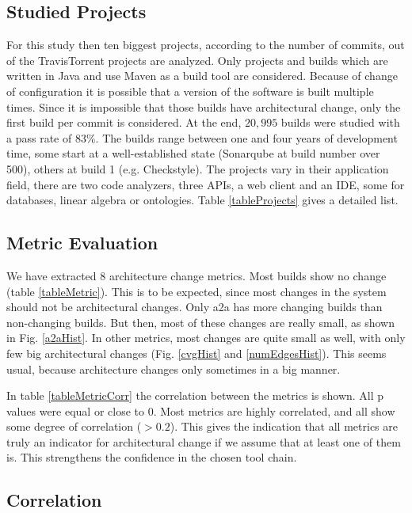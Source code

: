 \documentclass[conference]{IEEEtran}
\begin{document}
\subsection{Studied Projects}

For this study then ten biggest projects, according to the number of commits, out of the TravisTorrent projects are analyzed. Only projects and builds which are written in Java and use Maven as a build tool are considered. Because of change of configuration it is possible that a version of the software is built multiple times. Since it is impossible that those builds have architectural change, only the first build per commit is considered. At the end, $20,995$ builds were studied with a pass rate of $83\%$. The builds range between one and four years of development time, some start at a well-established state (Sonarqube at build number over 500), others at build 1 (e.g. Checkstyle). The projects vary in their application field, there are two code analyzers, three APIs, a web client and an IDE, some for databases, linear algebra or ontologies. Table \ref{tableProjects} gives a detailed list.

\subsection{Metric Evaluation}



We have extracted 8 architecture change metrics. Most builds show no change (table \ref{tableMetric}). This is to be expected, since most changes in the system should not be architectural changes. 
Only a2a has more changing builds than non-changing builds. But then, most of these changes are really small, as shown in Fig. \ref{a2aHist}. In other metrics, most changes are quite small as well, with only few big architectural changes (Fig. \ref{cvgHist} and \ref{numEdgesHist}). This seems usual, because architecture changes only sometimes in a big manner.

In table \ref{tableMetricCorr} the correlation between the metrics is shown. All p values were equal or close to 0. Most metrics are highly correlated, and all show some degree of correlation ($>0.2$). This gives the indication that all metrics are truly an indicator for architectural change if we assume that at least one of them is. This strengthens the confidence in the chosen tool chain. 

\subsection{Correlation}
\end{document}
